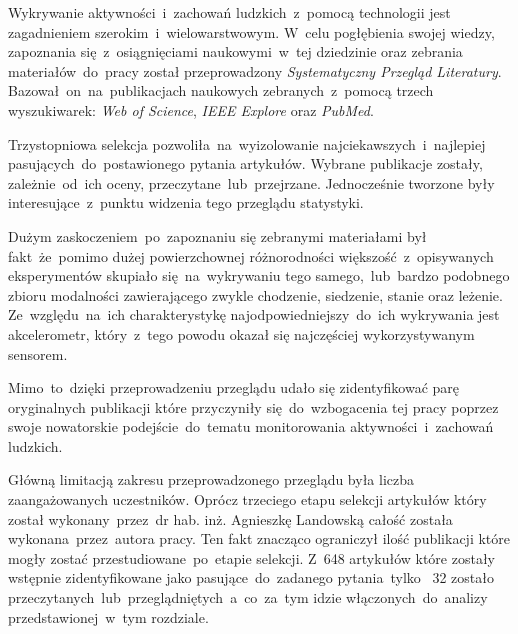 Wykrywanie aktywności~i~zachowań ludzkich~z~pomocą technologii jest zagadnieniem szerokim~i~wielowarstwowym. W~celu pogłębienia swojej wiedzy, zapoznania się~z~osiągnięciami naukowymi~w~tej dziedzinie oraz zebrania materiałów~do~pracy został przeprowadzony \textit{Systematyczny Przegląd Literatury}. Bazował~on~na~publikacjach naukowych zebranych~z~pomocą trzech wyszukiwarek: \textit{Web of Science}, \textit{IEEE Explore} oraz \textit{PubMed}. 

Trzystopniowa selekcja pozwoliła~na~wyizolowanie najciekawszych~i~najlepiej pasujących~do~postawionego pytania artykułów. Wybrane publikacje zostały, zależnie~od~ich oceny, przeczytane~lub~przejrzane. Jednocześnie tworzone były interesujące~z~punktu widzenia tego przeglądu statystyki. 

Dużym zaskoczeniem~po~zapoznaniu się zebranymi materiałami był fakt~że~pomimo dużej powierzchownej  różnorodności większość~z~opisywanych eksperymentów skupiało się~na~wykrywaniu tego samego,~lub~bardzo podobnego zbioru modalności zawierającego zwykle chodzenie, siedzenie, stanie oraz leżenie. Ze~względu~na~ich charakterystykę najodpowiedniejszy~do~ich wykrywania jest akcelerometr, który~z~tego powodu okazał się najczęściej wykorzystywanym sensorem.

Mimo~to~dzięki przeprowadzeniu przeglądu udało się zidentyfikować parę oryginalnych publikacji które przyczyniły się~do~wzbogacenia tej pracy poprzez swoje nowatorskie podejście~do~tematu monitorowania aktywności~i~zachowań ludzkich.

Główną limitacją zakresu przeprowadzonego przeglądu była liczba zaangażowanych uczestników. Oprócz trzeciego etapu selekcji artykułów który został wykonany~przez~dr hab. inż. Agnieszkę Landowską całość została wykonana~przez~autora pracy. Ten fakt znacząco ograniczył ilość publikacji które mogły zostać przestudiowane~po~etapie selekcji. Z~648 artykułów które zostały wstępnie zidentyfikowane jako pasujące~do~zadanego pytania~tylko~ 32 zostało przeczytanych~lub~przeglądniętych~a~co~za~tym idzie włączonych~do~analizy przedstawionej~w~tym rozdziale.
